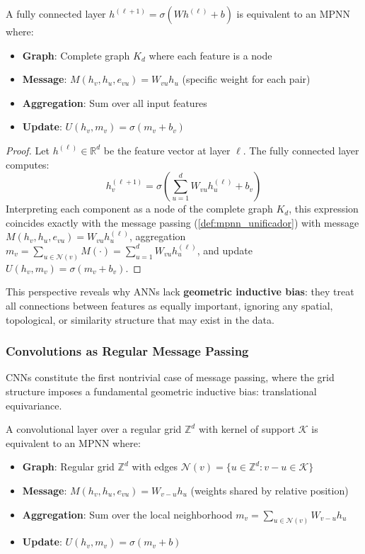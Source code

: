 \begin{proposition}\label{prop:ann_mpnn}
A fully connected layer $h^{(\ell+1)} = \sigma(W h^{(\ell)} + b)$ is equivalent to an \gls{MPNN} where:
\begin{itemize}
    \item \textbf{Graph}: Complete graph $K_d$ where each feature is a node
    \item \textbf{Message}: $M(h_v, h_u, e_{vu}) = W_{vu} h_u$ (specific weight for each pair)
    \item \textbf{Aggregation}: Sum over all input features
    \item \textbf{Update}: $U(h_v, m_v) = \sigma(m_v + b_v)$
\end{itemize}
\end{proposition}

\begin{proof}
Let $h^{(\ell)} \in \mathbb{R}^d$ be the feature vector at layer $\ell$. The fully connected layer computes:
\[
h_v^{(\ell+1)} = \sigma\!\left(\sum_{u=1}^{d} W_{vu} h_u^{(\ell)} + b_v\right)
\]
Interpreting each component as a node of the complete graph $K_d$, this expression coincides exactly with the message passing (\autoref{def:mpnn_unificador}) with message $M(h_v, h_u, e_{vu}) = W_{vu} h_u^{(\ell)}$, aggregation $m_v = \sum_{u \in \mathcal{N}(v)} M(\cdot) = \sum_{u=1}^d W_{vu} h_u^{(\ell)}$, and update $U(h_v, m_v) = \sigma(m_v + b_v)$.
\end{proof}

This perspective reveals why \glspl{ANN} lack \textbf{geometric inductive bias}: they treat all connections between features as equally important, ignoring any spatial, topological, or similarity structure that may exist in the data.

\subsubsection{Convolutions as Regular Message Passing}

\glspl{CNN} constitute the first nontrivial case of message passing, where the grid structure imposes a fundamental geometric inductive bias: translational equivariance.

\begin{proposition}\label{prop:cnn_mpnn}
A convolutional layer over a regular grid $\mathbb{Z}^d$ with kernel of support $\mathcal{K}$ is equivalent to an \gls{MPNN} where:
\begin{itemize}
    \item \textbf{Graph}: Regular grid $\mathbb{Z}^d$ with edges $\mathcal{N}(v) = \{u \in \mathbb{Z}^d : v - u \in \mathcal{K}\}$
    \item \textbf{Message}: $M(h_v, h_u, e_{vu}) = W_{v-u} h_u$ (weights shared by relative position)
    \item \textbf{Aggregation}: Sum over the local neighborhood $m_v = \sum_{u \in \mathcal{N}(v)} W_{v-u} h_u$
    \item \textbf{Update}: $U(h_v, m_v) = \sigma(m_v + b)$
\end{itemize}
\end{proposition}

